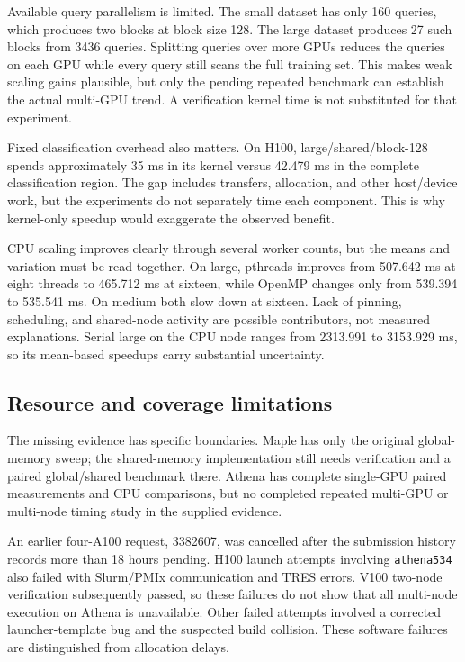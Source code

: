 \documentclass[conference]{IEEEtran}
\begin{document}
Available query parallelism is limited. The small dataset has only 160 queries, which produces two blocks at block size 128. The large dataset produces 27 such blocks from 3436 queries. Splitting queries over more GPUs reduces the queries on each GPU while every query still scans the full training set. This makes weak scaling gains plausible, but only the pending repeated benchmark can establish the actual multi-GPU trend. A verification kernel time is not substituted for that experiment.

Fixed classification overhead also matters. On H100, large/shared/block-128 spends approximately 35 ms in its kernel versus 42.479 ms in the complete classification region. The gap includes transfers, allocation, and other host/device work, but the experiments do not separately time each component. This is why kernel-only speedup would exaggerate the observed benefit.

CPU scaling improves clearly through several worker counts, but the means and variation must be read together. On large, pthreads improves from 507.642 ms at eight threads to 465.712 ms at sixteen, while OpenMP changes only from 539.394 to 535.541 ms. On medium both slow down at sixteen. Lack of pinning, scheduling, and shared-node activity are possible contributors, not measured explanations. Serial large on the CPU node ranges from 2313.991 to 3153.929 ms, so its mean-based speedups carry substantial uncertainty.

\subsection{Resource and coverage limitations}
The missing evidence has specific boundaries. Maple has only the original global-memory sweep; the shared-memory implementation still needs verification and a paired global/shared benchmark there. Athena has complete single-GPU paired measurements and CPU comparisons, but no completed repeated multi-GPU or multi-node timing study in the supplied evidence.

An earlier four-A100 request, 3382607, was cancelled after the submission history records more than 18 hours pending. H100 launch attempts involving \texttt{athena534} also failed with Slurm/PMIx communication and TRES errors. V100 two-node verification subsequently passed, so these failures do not show that all multi-node execution on Athena is unavailable. Other failed attempts involved a corrected launcher-template bug and the suspected build collision. These software failures are distinguished from allocation delays.
\end{document}
